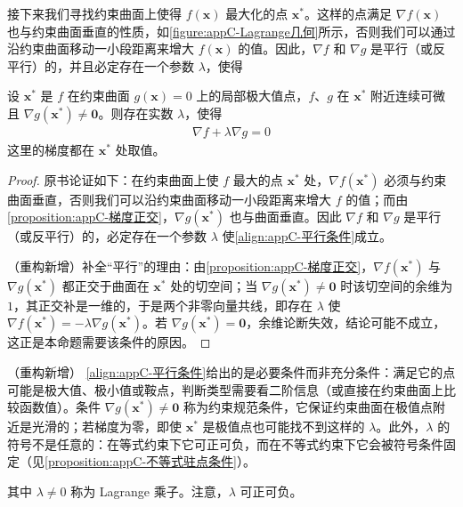 \documentclass[../main.tex]{subfiles}
\begin{document}
接下来我们寻找约束曲面上使得 $f(\bm{x})$ 最大化的点 $\bm{x}^{*}$。这样的点满足 $\nabla f(\bm{x})$ 也与约束曲面垂直的性质，如\cref{figure:appC-Lagrange几何}所示，否则我们可以通过沿约束曲面移动一小段距离来增大 $f(\bm{x})$ 的值。因此，$\nabla f$ 和 $\nabla g$ 是平行（或反平行）的，并且必定存在一个参数 $\lambda$，使得
\begin{proposition}[约束极值点的必要条件]\label{proposition:appC-约束驻点}
设 $\bm{x}^{*}$ 是 $f$ 在约束曲面 $g(\bm{x})=0$ 上的局部极大值点，$f$、$g$ 在 $\bm{x}^{*}$ 附近连续可微且 $\nabla g(\bm{x}^{*})\neq\bm{0}$。则存在实数 $\lambda$，使得
\begin{align}
  \nabla f+\lambda\nabla g=0
  \label{align:appC-平行条件}
\end{align}
这里的梯度都在 $\bm{x}^{*}$ 处取值。
\end{proposition}

\begin{proof}
原书论证如下：在约束曲面上使 $f$ 最大的点 $\bm{x}^{*}$ 处，$\nabla f(\bm{x}^{*})$ 必须与约束曲面垂直，否则我们可以沿约束曲面移动一小段距离来增大 $f$ 的值；而由\cref{proposition:appC-梯度正交}，$\nabla g(\bm{x}^{*})$ 也与曲面垂直。因此 $\nabla f$ 和 $\nabla g$ 是平行（或反平行）的，必定存在一个参数 $\lambda$ 使\eqref{align:appC-平行条件}成立。

（重构新增）补全“平行”的理由：由\cref{proposition:appC-梯度正交}，$\nabla f(\bm{x}^{*})$ 与 $\nabla g(\bm{x}^{*})$ 都正交于曲面在 $\bm{x}^{*}$ 处的切空间；当 $\nabla g(\bm{x}^{*})\neq\bm{0}$ 时该切空间的余维为 $1$，其正交补是一维的，于是两个非零向量共线，即存在 $\lambda$ 使 $\nabla f(\bm{x}^{*})=-\lambda\nabla g(\bm{x}^{*})$。若 $\nabla g(\bm{x}^{*})=\bm{0}$，余维论断失效，结论可能不成立，这正是本命题需要该条件的原因。
\end{proof}

\begin{remark}（重构新增）
\eqref{align:appC-平行条件}给出的是必要条件而非充分条件：满足它的点可能是极大值、极小值或鞍点，判断类型需要看二阶信息（或直接在约束曲面上比较函数值）。条件 $\nabla g(\bm{x}^{*})\neq\bm{0}$ 称为约束规范条件，它保证约束曲面在极值点附近是光滑的；若梯度为零，即使 $\bm{x}^{*}$ 是极值点也可能找不到这样的 $\lambda$。此外，$\lambda$ 的符号不是任意的：在等式约束下它可正可负，而在不等式约束下它会被符号条件固定（见\cref{proposition:appC-不等式驻点条件}）。
\end{remark}

其中 $\lambda\neq0$ 称为 Lagrange 乘子。注意，$\lambda$ 可正可负。
\end{document}
